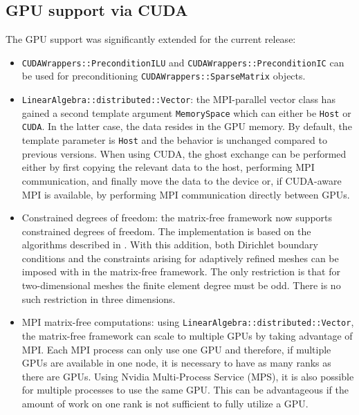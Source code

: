 \documentclass{ansarticle-preprint}
\begin{document}
\subsection{GPU support via CUDA}
\label{subsec:gpu}

The GPU support was significantly extended for the current release:
\begin{itemize}
  \item \texttt{CUDAWrappers::PreconditionILU} and \texttt{CUDAWrappers::PreconditionIC}
    can be used for preconditioning \texttt{CUDAWrappers::SparseMatrix} objects.
  \item \texttt{LinearAlgebra::distributed::Vector}: the MPI-parallel vector
    class has gained a second template argument \texttt{MemorySpace} which can
    either be \texttt{Host} or \texttt{CUDA}. In the latter case, the data
    resides in the GPU memory. By default, the template parameter is
    \texttt{Host} and the behavior is unchanged compared to previous versions.
    When using CUDA, the ghost exchange can be performed either by first copying
    the relevant data to the host, performing MPI communication, and finally
    move the data to the device or, if CUDA-aware MPI is available, by
    performing MPI communication directly between GPUs.
  \item Constrained degrees of freedom: the matrix-free framework now
    supports constrained degrees of freedom. The implementation is based on the algorithms described in
    \cite{ljungkvist2017}. With this addition, both Dirichlet
    boundary conditions and the constraints arising for adaptively
    refined meshes can be imposed with in the matrix-free framework. The only restriction is that for two-dimensional meshes the
    finite element degree must be odd.  There is no such restriction in three
    dimensions.
  \item MPI matrix-free computations: using \texttt{LinearAlgebra::distributed::Vector}, the
    matrix-free framework can scale to multiple GPUs by taking
    advantage of MPI. Each MPI process can only use one GPU and therefore, if
    multiple GPUs are available in one node, it is necessary to have as many
    ranks as there are GPUs. Using Nvidia Multi-Process Service (MPS), it is also possible
    for multiple processes to use the same GPU. This can be advantageous if the
    amount of work on one rank is not sufficient to fully utilize a GPU.
\end{itemize}
\end{document}
